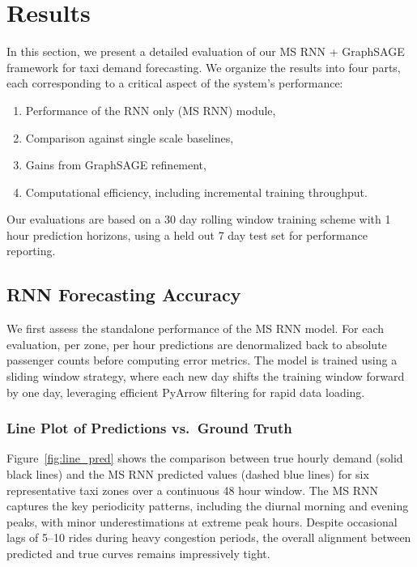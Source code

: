 \documentclass{article}
\begin{document}
\section{Results}
\label{sec:results}

In this section, we present a detailed evaluation of our MS RNN + GraphSAGE framework for taxi demand forecasting.  
We organize the results into four parts, each corresponding to a critical aspect of the system’s performance:
\begin{enumerate}
  \item Performance of the RNN only (MS RNN) module,
  \item Comparison against single scale baselines,
  \item Gains from GraphSAGE refinement,
  \item Computational efficiency, including incremental training throughput.
\end{enumerate}
Our evaluations are based on a 30 day rolling window training scheme with 1 hour prediction horizons, using a held out 7 day test set for performance reporting.

\subsection{RNN Forecasting Accuracy}

We first assess the standalone performance of the MS RNN model. For each evaluation, per zone, per hour predictions are denormalized back to absolute passenger counts before computing error metrics. 
The model is trained using a sliding window strategy, where each new day shifts the training window forward by one day, leveraging efficient PyArrow filtering for rapid data loading.

\subsubsection{Line Plot of Predictions vs.\ Ground Truth}

Figure~\ref{fig:line_pred} shows the comparison between true hourly demand (solid black lines) and the MS RNN predicted values (dashed blue lines) for six representative taxi zones over a continuous 48 hour window.  
The MS RNN captures the key periodicity patterns, including the diurnal morning and evening peaks, with minor underestimations at extreme peak hours.  
Despite occasional lags of 5–10 rides during heavy congestion periods, the overall alignment between predicted and true curves remains impressively tight.
\end{document}
